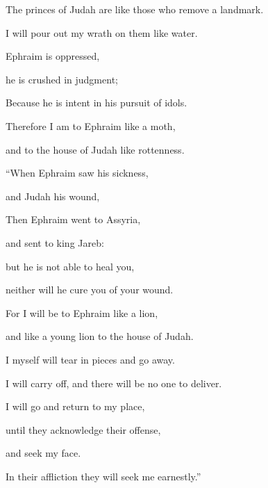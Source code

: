 {\par }{\Q {}The princes of Judah are like those who remove a landmark.
\par }{\QB I will pour out my wrath on them like water.
\par }{\Q {}Ephraim is oppressed,
\par }{\QB he is crushed in judgment;
\par }{\QB Because he is intent in his pursuit of idols.
\par }{\Q {}Therefore I am to Ephraim like a moth,
\par }{\QB and to the house of Judah like rottenness.
\par }{\BB \par }{\Q {}“When Ephraim saw his sickness,
\par }{\QB and Judah his wound,
\par }{\QB Then Ephraim went to Assyria,
\par }{\QB and sent to king Jareb:
\par }{\Q but he is not able to heal you,
\par }{\QB neither will he cure you of your wound.
\par }{\Q {}For I will be to Ephraim like a lion,
\par }{\QB and like a young lion to the house of Judah.
\par }{\Q I myself will tear in pieces and go away.
\par }{\QB I will carry off, and there will be no one to deliver.
\par }{\Q {}I will go and return to my place,
\par }{\QB until they acknowledge their offense,
\par }{\QB and seek my face.
\par }{\QB In their affliction they will seek me earnestly.”
\par }{\BB \par }
